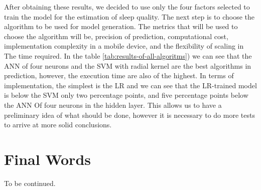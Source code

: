 \documentclass[]{book}
\begin{document}
After obtaining these results, we decided to use only the four factors
selected to train the model for the estimation of sleep quality. The
next step is to choose the algorithm to be used for model generation.
The metrics that will be used to choose the algorithm will be, precision
of prediction, computational cost, implementation complexity in a mobile
device, and the flexibility of scaling in The time required. In the
table \ref{tab:results-of-all-algoritms}) we can see that the ANN of
four neurons and the SVM with radial kernel are the best algorithms in
prediction, however, the execution time are also of the highest. In
terms of implementation, the simplest is the LR and we can see that the
LR-trained model is below the SVM only two percentage points, and five
percentage points below the ANN Of four neurons in the hidden layer.
This allows us to have a preliminary idea of what should be done,
however it is necessary to do more tests to arrive at more solid
conclusions.

\chapter{Final Words}\label{final-words}

To be continued.


\end{document}
